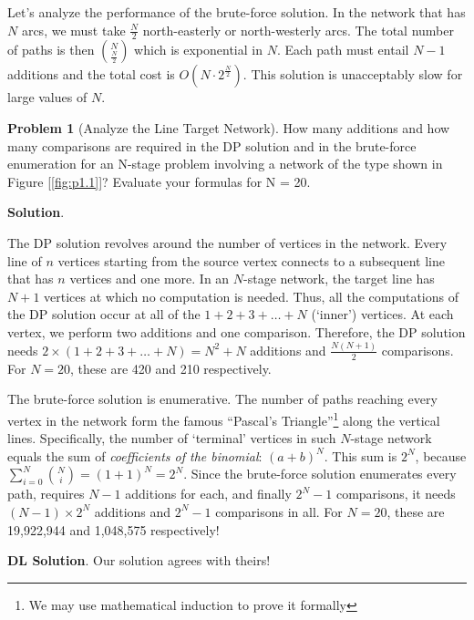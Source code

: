 \documentclass[english,notitlepage,smartquotes]{hgbreport}
\theoremstyle{definition}
\theoremstyle{definition}
\newtheorem{problem}{Problem}
\theoremstyle{remark}
\theoremstyle{definition}
\theoremstyle{plain}
\theoremstyle{definition}
\begin{document}
Let's analyze the performance of the brute-force solution. In the network that has $N$ arcs, we must take $\frac{N}{2}$ north-easterly or north-westerly arcs. The total number of paths is then ${N \choose \frac{N}{2}}$ which is exponential in $N$. Each path must entail $N-1$ additions and the total cost is $O(N\cdot 2^{\frac{N}{2}})$. This solution is unacceptably slow for large values of $N$.

\hrulefill

\begin{problem}[Analyze the Line Target Network]
How many additions and how many comparisons are required in the DP solution and in the brute-force enumeration for an N-stage problem involving a network of the type shown in Figure [\ref{fig:p1.1}]? Evaluate your formulas for N = 20.
\end{problem}

\textbf{Solution}.

The DP solution revolves around the number of vertices in the network. Every line of $n$ vertices starting from the source vertex connects to a subsequent line that has $n$ vertices and one more. In an $N$-stage network, the target line has $N+1$ vertices at which no computation is needed. Thus, all the computations of the DP solution occur at all of the $1+2+3+\dots+N$ (`inner') vertices. At each vertex, we perform two additions and one comparison. Therefore, the DP solution needs $2\times(1+2+3+\dots+N)=N^2+N$ additions and $\frac{N(N+1)}{2}$ comparisons. For $N=20$, these are 420 and 210 respectively.

The brute-force solution is enumerative. The number of paths reaching every vertex in the network form the famous ``Pascal's Triangle''\footnote{We may use mathematical induction to prove it formally} along the vertical lines. Specifically, the number of `terminal' vertices in such $N$-stage network equals the sum of \emph{coefficients of the binomial}: $(a+b)^N$. This sum is $2^N$, because $\displaystyle\sum_{i=0}^{N}{N\choose i}=(1+1)^N=2^N$. Since the brute-force solution enumerates every path, requires $N-1$ additions for each, and finally $2^N-1$ comparisons, it needs $(N-1)\times2^{N}$ additions and $2^{N}-1$ comparisons in all. For $N=20$, these are 19,922,944 and 1,048,575 respectively!

\textbf{DL Solution}. Our solution agrees with theirs!

\hrulefill
\end{document}
